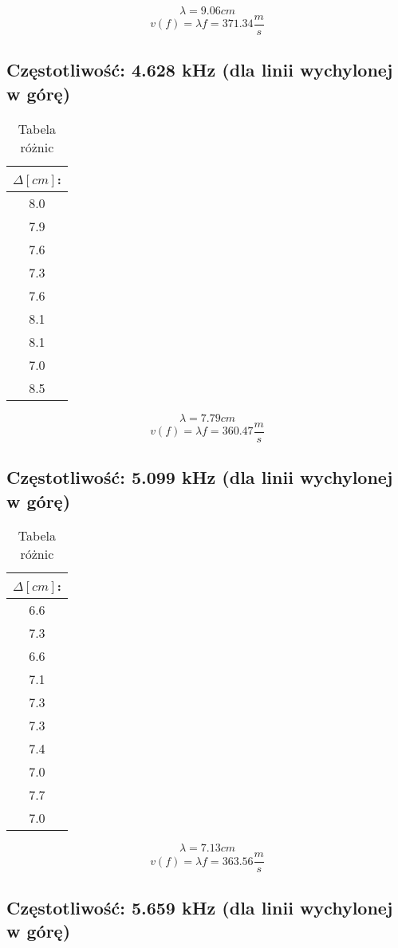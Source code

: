 \documentclass[polish,a4paper]{article}
\begin{document}
$$\lambda = 9.06 cm$$
$$v(f) = \lambda f = 371.34 \frac{m}{s}$$

\subsection{Częstotliwość: 4.628 kHz (dla linii wychylonej w górę)}

\begin{table}[H]
\centering
\begin{tabular}{|c|}
\hline
$\Delta [cm]$:\\
\hline 
8.0 \\
7.9 \\
7.6 \\
7.3 \\
7.6 \\
8.1 \\
8.1 \\
7.0 \\
8.5 \\
\hline
\end{tabular}
\caption{Tabela różnic}
\end{table}

$$\lambda = 7.79 cm$$
$$v(f) = \lambda f = 360.47 \frac{m}{s}$$

\subsection{Częstotliwość: 5.099 kHz (dla linii wychylonej w górę)}

\begin{table}[H]
\centering
\begin{tabular}{|c|}
\hline
$\Delta [cm]$:\\
\hline 
6.6 \\
7.3 \\
6.6 \\
7.1 \\
7.3 \\
7.3 \\
7.4 \\
7.0 \\
7.7 \\
7.0 \\
\hline
\end{tabular}
\caption{Tabela różnic}
\end{table}

$$\lambda = 7.13 cm$$
$$v(f) = \lambda f = 363.56 \frac{m}{s}$$

\subsection{Częstotliwość: 5.659 kHz (dla linii wychylonej w górę)}
\end{document}
